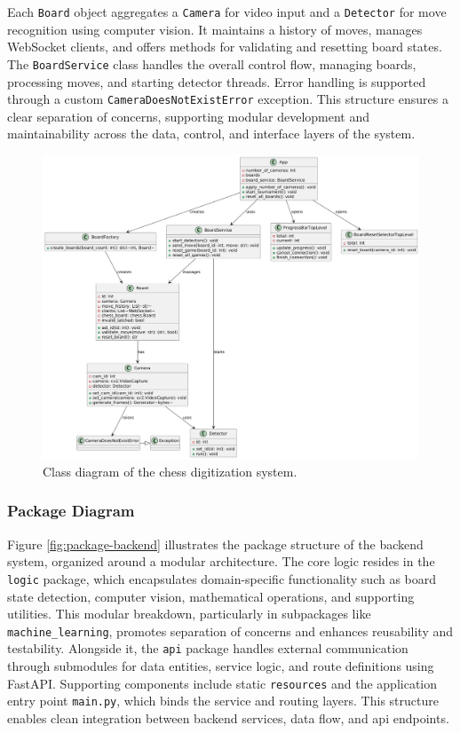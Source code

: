 \newpage

Each \texttt{Board} object aggregates a \texttt{Camera} for video input and a \texttt{Detector} for move recognition using computer vision. It maintains a history of moves, manages WebSocket clients, and offers methods for validating and resetting board states. The \texttt{BoardService} class handles the overall control flow, managing boards, processing moves, and starting detector threads. Error handling is supported through a custom \texttt{CameraDoesNotExistError} exception. This structure ensures a clear separation of concerns, supporting modular development and maintainability across the data, control, and interface layers of the system.

\begin{figure}[h!]
\centering
\includegraphics[width=0.75\linewidth]{figures/results//uml/class.png}
\caption[Class Diagram]{Class diagram of the chess digitization system.}
\label{fig:class}
\end{figure}

\subsubsection*{Package Diagram}

Figure \ref{fig:package-backend} illustrates the package structure of the backend system, organized around a modular architecture. The core logic resides in the \texttt{logic} package, which encapsulates domain-specific functionality such as board state detection, computer vision, mathematical operations, and supporting utilities. This modular breakdown, particularly in subpackages like \texttt{machine\_learning}, promotes separation of concerns and enhances reusability and testability. Alongside it, the \texttt{api} package handles external communication through submodules for data entities, service logic, and route definitions using FastAPI. Supporting components include static \texttt{resources} and the application entry point \texttt{main.py}, which binds the service and routing layers. This structure enables clean integration between backend services, data flow, and \gls{api} endpoints. \\

